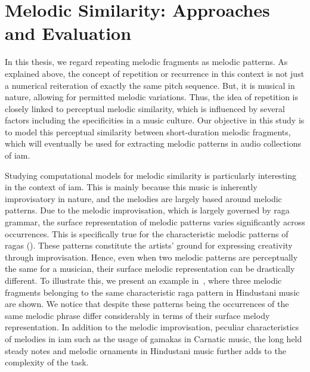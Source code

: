 \section{Melodic Similarity: Approaches and Evaluation}
\label{sec:patterns_evaluation_of_similarity_measures}

In this thesis, we regard repeating melodic fragments as melodic patterns. As explained above, the concept of repetition or recurrence in this context is not just a numerical reiteration of exactly the same pitch sequence. But, it is musical in nature, allowing for permitted melodic variations. Thus, the idea of repetition is closely linked to perceptual melodic similarity, which is influenced by several factors including the specificities in a music culture. Our objective in this study is to model this perceptual similarity between short-duration melodic fragments, which will eventually be used for extracting melodic patterns in audio collections of \gls{iam}.

Studying computational models for melodic similarity is particularly interesting in the context of \gls{iam}. This is mainly because this music is inherently improvisatory in nature, and the melodies are largely based around melodic patterns. Due to the melodic improvisation, which is largely governed by \gls{raga} grammar, the surface representation of melodic patterns varies significantly across occurrences. This is specifically true for the characteristic melodic patterns of \glspl{raga} (). These patterns constitute the artists' ground for expressing creativity through improvisation. Hence, even when two melodic patterns are perceptually the same for a musician, their surface melodic representation can be drastically different. To illustrate this, we present an example in~, where three melodic fragments belonging to the same characteristic \gls{raga} pattern in Hindustani music are shown. We notice that despite these patterns being the occurrences of the same melodic phrase differ considerably in terms of their surface melody representation. In addition to the melodic improvisation, peculiar characteristics of melodies in \gls{iam} such as the usage of \glspl{gamaka} in Carnatic music, the long held steady notes and melodic ornaments in Hindustani music further adds to the complexity of the task.

